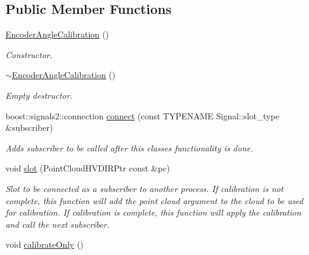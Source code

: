 \subsection*{Public Member Functions}
\begin{DoxyCompactItemize}
\item 
\hypertarget{structquanergy_1_1calibration_1_1EncoderAngleCalibration_a4c86719a8e5a36a1b14dba38e5bd4901}{\hyperlink{structquanergy_1_1calibration_1_1EncoderAngleCalibration_a4c86719a8e5a36a1b14dba38e5bd4901}{Encoder\-Angle\-Calibration} ()}\label{structquanergy_1_1calibration_1_1EncoderAngleCalibration_a4c86719a8e5a36a1b14dba38e5bd4901}

\begin{DoxyCompactList}\small\item\em Constructor. \end{DoxyCompactList}\item 
\hypertarget{structquanergy_1_1calibration_1_1EncoderAngleCalibration_a0fa758e2353874d4d8a2d49c28fce4ba}{\hyperlink{structquanergy_1_1calibration_1_1EncoderAngleCalibration_a0fa758e2353874d4d8a2d49c28fce4ba}{$\sim$\-Encoder\-Angle\-Calibration} ()}\label{structquanergy_1_1calibration_1_1EncoderAngleCalibration_a0fa758e2353874d4d8a2d49c28fce4ba}

\begin{DoxyCompactList}\small\item\em Empty destructor. \end{DoxyCompactList}\item 
boost\-::signals2\-::connection \hyperlink{structquanergy_1_1calibration_1_1EncoderAngleCalibration_a1b1d924f8633dcb48898c32d7fabf651}{connect} (const T\-Y\-P\-E\-N\-A\-M\-E Signal\-::slot\-\_\-type \&subscriber)
\begin{DoxyCompactList}\small\item\em Adds subscriber to be called after this classes functionality is done. \end{DoxyCompactList}\item 
void \hyperlink{structquanergy_1_1calibration_1_1EncoderAngleCalibration_ac73746735a610fe7f4b9a261f5eabf9f}{slot} (Point\-Cloud\-H\-V\-D\-I\-R\-Ptr const \&pc)
\begin{DoxyCompactList}\small\item\em Slot to be connected as a subscriber to another process. If calibration is not complete, this function will add the point cloud argument to the cloud to be used for calibration. If calibration is complete, this function will apply the calibration and call the next subscriber. \end{DoxyCompactList}\item 
\hypertarget{structquanergy_1_1calibration_1_1EncoderAngleCalibration_acd0f552b95aa74d0738d7c5d7e89d1fa}{void \hyperlink{structquanergy_1_1calibration_1_1EncoderAngleCalibration_acd0f552b95aa74d0738d7c5d7e89d1fa}{calibrate\-Only} ()}\label{structquanergy_1_1calibration_1_1EncoderAngleCalibration_acd0f552b95aa74d0738d7c5d7e89d1fa}


\end{DoxyCompactItemize}
